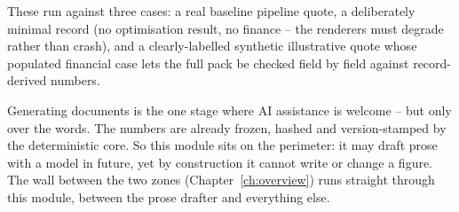 These run against three cases: a real baseline pipeline quote, a deliberately minimal record (no optimisation result, no finance -- the renderers must degrade rather than crash), and a clearly-labelled synthetic illustrative quote whose populated financial case lets the full pack be checked field by field against record-derived numbers.

\begin{keyidea}
Generating documents is the one stage where AI assistance is welcome -- but only over the words. The numbers are already frozen, hashed and version-stamped by the deterministic core. So this module sits on the perimeter: it may draft prose with a model in future, yet by construction it cannot write or change a figure. The wall between the two zones (Chapter~\ref{ch:overview}) runs straight through this module, between the prose drafter and everything else.
\end{keyidea}

